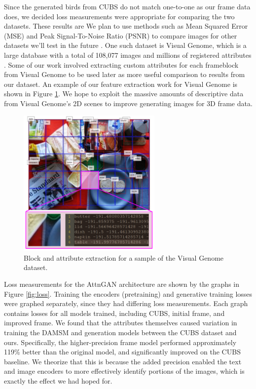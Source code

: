 \documentclass[letterpaper]{article} %
\begin{document}
Since the generated birds from CUBS do not match one-to-one as our frame data 
does, we decided loss measurements were appropriate for comparing the two 
datasets. These results are 
We plan to use methods such as Mean Squared Error (MSE) and Peak 
Signal-To-Noise Ratio (PSNR) to compare images for other datasets we'll test in 
the future \cite{srgan}. One such dataset is Visual Genome, which is a large 
database with a total of 108,077 images and millions of registered attributes 
\cite{visual_genome}. Some of our work involved extracting custom attributes 
for each frameblock from Visual Genome to be used later as more useful 
comparison to results from our dataset. An example of our feature extraction 
work for Visual Genome is shown in Figure \ref{fig:visual_genome}. We hope to 
exploit the massive amounts of descriptive data from Visual Genome's 2D scenes 
to improve generating images for 3D frame data.

\begin{figure}[htbp]
\centerline{\includegraphics[width=7cm]{visual_genome.png}}
\caption{Block and attribute extraction for a sample of the Visual Genome 
dataset.}
\label{fig:visual_genome}
\end{figure}

Loss measurements for the AttnGAN architecture are shown by the graphs in 
Figure \ref{fig:loss}. Training the encoders (pretraining) and generative 
training losses were graphed separately, since they had differing loss 
measurements. Each graph contains losses for all models trained, including 
CUBS, initial frame, and improved frame. We found that the attributes 
themselves caused variation in training the 
DAMSM and generation models between the CUBS dataset and ours. Specifically, 
the higher-precision frame model performed approximately 119\% better than the 
original model, and significantly improved on the CUBS baseline. We theorize 
that this is because the added precision enabled the text and image encoders to 
more effectively identify portions of the images, which is exactly the 
effect we had hoped for.
\end{document}
